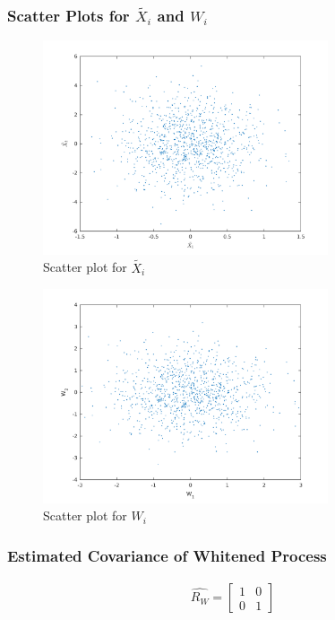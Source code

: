 \documentclass{article}
\begin{document}
		\subsubsection{Scatter Plots for $\tilde{X_{i}}$ and $W_{i}$}
			\begin{figure}[h]
				\begin{center}
				\includegraphics[width=0.75\textwidth]{rvXtildaEsti.png}
				\caption{Scatter plot for $\tilde{X_{i}}$}
				\end{center}
			\end{figure}
			\begin{figure}[h]
				\begin{center}
				\includegraphics[width=0.75\textwidth]{rvWEsti.png}
				\caption{Scatter plot for $W_{i}$}
				\end{center}
			\end{figure}
		\subsubsection{Estimated Covariance of Whitened Process}
			\begin{align*}
				\hat{R_{W}} =
				\begin{bmatrix}
					1 & 0 \\
					0 & 1
				\end{bmatrix}
			\end{align*}




\end{document}
